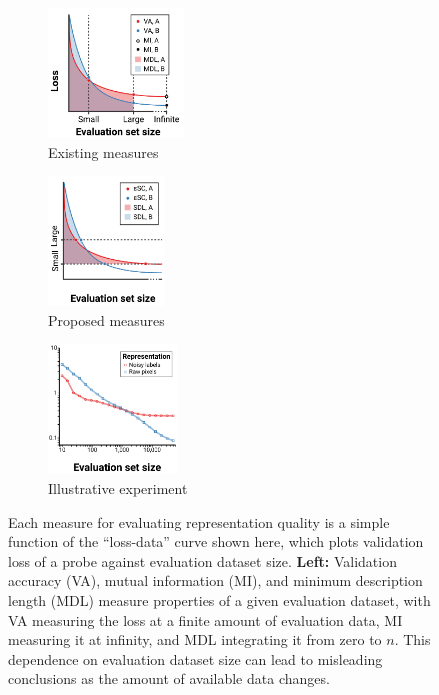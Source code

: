 \begin{figure}[t]
\begin{subfigure}[b]{.33\textwidth}
  \centering
  \includegraphics[height=130px]{figures/repr-eval/cartoon_left.pdf}
  \caption{Existing measures}
  \label{fig:cartoon_left}
\end{subfigure}
\begin{subfigure}[b]{.32\textwidth}
  \centering
  \includegraphics[height=130px]{figures/repr-eval/cartoon_right.pdf}
  \caption{Proposed measures}
  \label{fig:cartoon_right}
\end{subfigure}
\begin{subfigure}[b]{.32\textwidth}
  \centering
  \includegraphics[height=130px]{figures/repr-eval/noisygt_bold_fixedloss.pdf}
  \caption{Illustrative experiment}
  \label{fig:noisygt}
\end{subfigure}
\caption{
Each measure for evaluating representation quality is a simple function of the ``loss-data'' curve shown here, which plots validation loss of a probe against evaluation dataset size.
\textbf{Left:} Validation accuracy (VA), mutual information (MI), and minimum description length (MDL) measure properties of a given evaluation dataset, with VA measuring the loss at a finite amount of evaluation data, MI measuring it at infinity, and MDL integrating it from zero to $n$.
This dependence on evaluation dataset size can lead to misleading conclusions as the amount of available data changes.
}
\end{figure}
